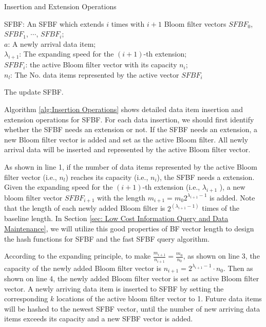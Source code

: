 \documentclass[10pt,journal,compsoc]{IEEEtran}
\begin{document}
\begin{algorithm}[h]
\caption{Insertion and Extension Operations}
\label{alg:Insertion Operations}
\begin{algorithmic}[1]
\small
\REQUIRE
SFBF: An SFBF which extends $i$ times with $i+1$ Bloom filter vectors $SFBF_0$, $SFBF_1$, $\cdots$, $SFBF_i$;\\
$a$: A newly arrival data item; \\
$\lambda_{i+1}$: The expanding speed for the  $(i+1)$-th extension;\\
$SFBF_i$: the active Bloom filter vector with its capacity $n_i$;\\
$n_l$: The No. data items represented by the active vector $SFBF_i$


\ENSURE
The update SFBF.\\

\ENDIF
{}
\ENDFOR
{}
\end{algorithmic}
\end{algorithm}

Algorithm \ref{alg:Insertion Operations} shows detailed data item insertion and extension  operations for SFBF. For each data insertion, we should first identify whether the SFBF needs an extension or not. If the SFBF needs an extension, a new Bloom filter vector is added and set as the active Bloom filter. All newly arrival data will be inserted and represented by the active Bloom filter vector.

As shown in line 1, if the number of data items represented by the active Bloom filter vector (i.e., $n_l$) reaches its capacity (i.e., ${n_i}$), the SFBF needs a extension. Given the expanding speed for the $(i+1)$-th extension (i.e., ${\lambda _{i+1}}$ ), a new bloom filter vector $SFBF_{i+1}$ with the length ${m_{i+1}} = {m_0}{2^{{\lambda_{i+1}}-1}}$ is added. Note that the length of each newly added Bloom filter is ${2^{\left( {{\lambda _{i+1}} - 1} \right)}}$ times of the baseline length. In Section \ref{sec: Low Cost Information Query and Data Maintenance}, we will utilize this  good properties of BF vector length  to design the hash functions for SFBF and the fast SFBF query algorithm.

According to the expanding principle, to make $\frac{{{m_{i + 1}}}}{{{n_{i + 1}}}} = \frac{{{m_0}}}{{{n_0}}}$,  as shown on line 3, the capacity of the newly added Bloom filter vector is ${n_{i + 1}} = {2^{{\lambda_{i+1} } - 1}} \cdot {n_0}$. Then as shown  on line 4, the newly added Bloom filter vector is set as active Bloom filter vector. A newly arriving data item is inserted to SFBF by setting the corresponding $k$ locations of the active bloom filter vector to 1. Future data items will be hashed to the newest SFBF vector, until  the number of new arriving data items exceeds its capacity and a new SFBF vector is added.
\end{document}
